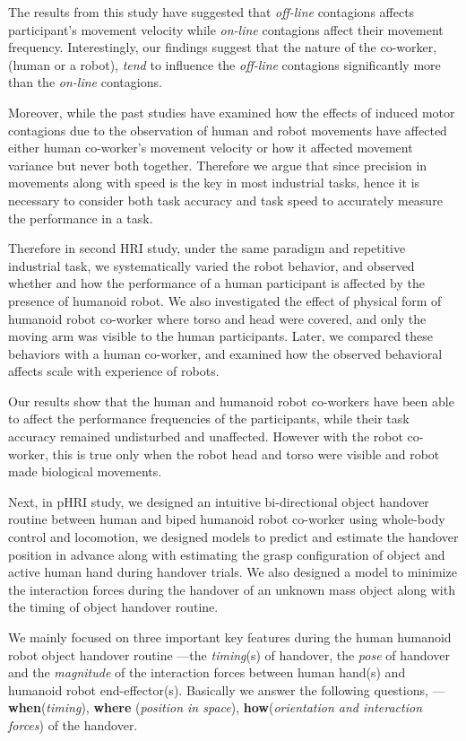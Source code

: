 The results from this study have suggested that \textit{off-line} contagions affects participant's movement velocity while \textit{on-line} contagions affect their movement frequency. Interestingly, our findings suggest that the nature of the co-worker, (human or a robot), \textit{tend} to influence the \textit{off-line} contagions significantly more than the \textit{on-line} contagions.


Moreover, while the past studies have examined how the effects of induced motor contagions due to the observation of human and robot movements have affected either human co-worker's movement velocity or how it affected movement variance but never both together. Therefore we argue that since precision in movements along with speed is the key in most industrial tasks, hence it is necessary to consider both task accuracy and task speed to accurately measure the performance in a task.

Therefore in second HRI study, under the same paradigm and repetitive industrial task, we systematically varied the robot behavior, and observed whether and how the performance of a human participant is affected by the presence of humanoid robot. We also investigated the effect of physical form of humanoid robot co-worker where torso and head were covered, and only the moving arm was visible to the human participants. Later, we compared these behaviors with a human co-worker, and examined how the observed behavioral affects scale with experience of robots. 

Our results show that the human and humanoid robot co-workers have been able to affect the performance frequencies of the participants, while their task accuracy remained undisturbed and unaffected. However with the robot co-worker, this is true only when the robot head and torso were visible and robot made biological movements.


Next, in pHRI study, we designed an intuitive bi-directional object handover routine between human and biped humanoid robot co-worker using whole-body control and locomotion, we designed models to predict and estimate the handover position in advance along with estimating the grasp configuration of object and active human hand during handover trials. We also designed a model to minimize the interaction forces during the handover of an unknown mass object along with the timing of object handover routine.

We mainly focused on three important key features during the human humanoid robot object handover routine ---the \textit{timing}(s) of handover, the \textit{pose} of handover and the \textit{magnitude} of the interaction forces between human hand(s) and humanoid robot end-effector(s). Basically we answer the following questions, ---\textbf{when}(\textit{timing}), \textbf{where} (\textit{position in space}), \textbf{how}(\textit{orientation and interaction forces}) of the handover.

